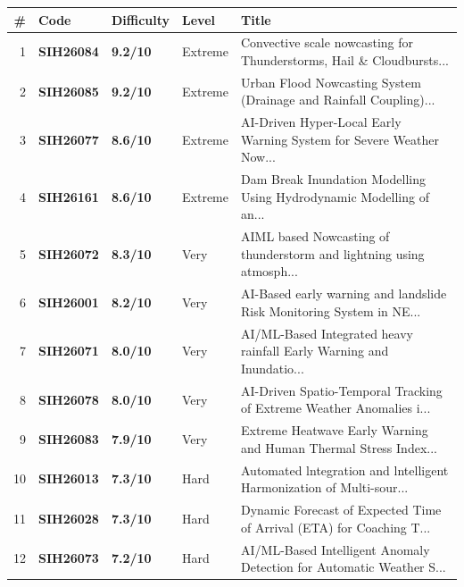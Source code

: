 \documentclass[10pt,a4paper]{article}
\begin{document}
\begin{tabular}{rlllp{8.5cm}}
\toprule
\textbf{\#} & \textbf{Code} & \textbf{Difficulty} & \textbf{Level} & \textbf{Title} \\
\midrule

1 & \textbf{SIH26084} & \textbf{9.2/10} & Extreme & Convective scale nowcasting for Thunderstorms, Hail \& Cloudbursts... \\

2 & \textbf{SIH26085} & \textbf{9.2/10} & Extreme & Urban Flood Nowcasting System (Drainage and Rainfall Coupling)... \\

3 & \textbf{SIH26077} & \textbf{8.6/10} & Extreme & AI-Driven Hyper-Local Early Warning System for Severe Weather Now... \\

4 & \textbf{SIH26161} & \textbf{8.6/10} & Extreme & Dam Break Inundation Modelling Using Hydrodynamic Modelling of an... \\

5 & \textbf{SIH26072} & \textbf{8.3/10} & Very & AIML based Nowcasting of thunderstorm and lightning using atmosph... \\

6 & \textbf{SIH26001} & \textbf{8.2/10} & Very & AI-Based early warning and landslide Risk Monitoring System in NE... \\

7 & \textbf{SIH26071} & \textbf{8.0/10} & Very & AI/ML-Based Integrated heavy rainfall Early Warning and Inundatio... \\

8 & \textbf{SIH26078} & \textbf{8.0/10} & Very & AI-Driven Spatio-Temporal Tracking of Extreme Weather Anomalies i... \\

9 & \textbf{SIH26083} & \textbf{7.9/10} & Very & Extreme Heatwave Early Warning and Human Thermal Stress Index... \\

10 & \textbf{SIH26013} & \textbf{7.3/10} & Hard & Automated lntegration and lntelligent Harmonization of Multi-sour... \\

11 & \textbf{SIH26028} & \textbf{7.3/10} & Hard & Dynamic Forecast of Expected Time of Arrival (ETA) for Coaching T... \\

12 & \textbf{SIH26073} & \textbf{7.2/10} & Hard & AI/ML-Based Intelligent Anomaly Detection for Automatic Weather S... \\


\end{tabular}
\end{document}
